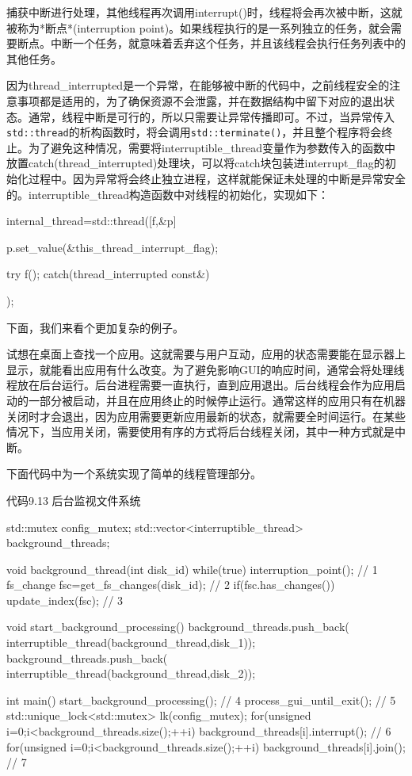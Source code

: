捕获中断进行处理，其他线程再次调用interrupt()时，线程将会再次被中断，这就被称为*断点*(interruption point)。如果线程执行的是一系列独立的任务，就会需要断点。中断一个任务，就意味着丢弃这个任务，并且该线程会执行任务列表中的其他任务。

因为thread\_interrupted是一个异常，在能够被中断的代码中，之前线程安全的注意事项都是适用的，为了确保资源不会泄露，并在数据结构中留下对应的退出状态。通常，线程中断是可行的，所以只需要让异常传播即可。不过，当异常传入\texttt{std::thread}的析构函数时，将会调用\texttt{std::terminate()}，并且整个程序将会终止。为了避免这种情况，需要将interruptible\_thread变量作为参数传入的函数中放置catch(thread\_interrupted)处理块，可以将catch块包装进interrupt\_flag的初始化过程中。因为异常将会终止独立进程，这样就能保证未处理的中断是异常安全的。interruptible\_thread构造函数中对线程的初始化，实现如下：

\begin{cpp}
internal_thread=std::thread([f,&p]{
        p.set_value(&this_thread_interrupt_flag);

        try
        {
          f();
        }
        catch(thread_interrupted const&)
        {}
      });
\end{cpp}

下面，我们来看个更加复杂的例子。


试想在桌面上查找一个应用。这就需要与用户互动，应用的状态需要能在显示器上显示，就能看出应用有什么改变。为了避免影响GUI的响应时间，通常会将处理线程放在后台运行。后台进程需要一直执行，直到应用退出。后台线程会作为应用启动的一部分被启动，并且在应用终止的时候停止运行。通常这样的应用只有在机器关闭时才会退出，因为应用需要更新应用最新的状态，就需要全时间运行。在某些情况下，当应用关闭，需要使用有序的方式将后台线程关闭，其中一种方式就是中断。

下面代码中为一个系统实现了简单的线程管理部分。

代码9.13 后台监视文件系统

\begin{cpp}
std::mutex config_mutex;
std::vector<interruptible_thread> background_threads;

void background_thread(int disk_id)
{
  while(true)
  {
    interruption_point();  // 1
    fs_change fsc=get_fs_changes(disk_id);  // 2
    if(fsc.has_changes())
    {
      update_index(fsc);  // 3
    }
  }
}

void start_background_processing()
{
  background_threads.push_back(
    interruptible_thread(background_thread,disk_1));
  background_threads.push_back(
    interruptible_thread(background_thread,disk_2));
}

int main()
{
  start_background_processing();  // 4
  process_gui_until_exit();  // 5
  std::unique_lock<std::mutex> lk(config_mutex);
  for(unsigned i=0;i<background_threads.size();++i)
  {
    background_threads[i].interrupt();  // 6
  }
  for(unsigned i=0;i<background_threads.size();++i)
  {
    background_threads[i].join(); // 7
  }
}
\end{cpp}

